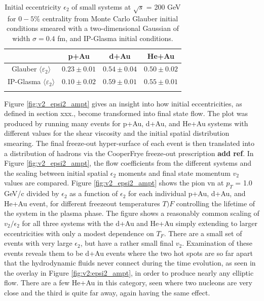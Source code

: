 \begin{table}[h!]
\begin{center}
\caption{Initial eccentricity $\epsilon_2$ of small systems at $\sqrt{s}$ = 200 GeV for $0-5\%$ centrality from Monte Carlo Glauber initial conditions smeared with a two-dimensional Gaussian of width $\sigma=0.4$ fm, and IP-Glasma initial conditions.}
\begin{tabular}{c c c c}
\label{table_geometry_glasma}
 & p+Au & d+Au & He+Au \\ \hline
 Glauber $\langle \varepsilon_2 \rangle$ & $0.23\pm 0.01$ & $0.54\pm 0.04$ & $0.50\pm 0.02$ \\
 IP-Glasma $\langle \varepsilon_2 \rangle$ & $0.10\pm 0.02$ & $0.59\pm 0.01$ & $0.55\pm 0.01$ \\
\label{tbl:eccentricities}
\end{tabular}
\end{center}
\end{table}

Figure \ref{fig:v2_epsi2_ampt} gives an insight into how initial eccentricities, as defined in section xxx., become transformed into final state flow.
The plot was produced by running many events for p+Au,
d+Au, and He+Au systems with different values for the shear
viscosity and the initial spatial distribution smearing.
The final freeze-out hyper-surface of each event is then
translated into a distribution of hadrons via the CooperFrye
freeze-out prescription \textbf{add ref}. In Figure \ref{fig:v2_epsi2_ampt},
the flow coefficients from the different systems and
the scaling between initial spatial $\epsilon_2$ moments and final
state momentum $v_2$ values are compared.
 Figure \ref{fig:v2_epsi2_ampt} shows the pion vn at
$p_T$ = 1.0 GeV/c divided by $\epsilon_2$ as a function of $\epsilon_2$ for each
individual p+Au, d+Au, and He+Au event, for different
freezeout temperatures $T)F$ controlling the lifetime of the
system in the plasma phase. The figure
shows a reasonably common scaling of $v_2/\epsilon_2$ for all three
systems with the d+Au and He+Au simply extending
to larger eccentricities with only a modest dependence
on $T_F$. There are a small set of events with very large
$\epsilon_2$, but have a rather small final $v_2$. Examination of these
events reveals them to be d+Au events where the two
hot spots are so far apart that the hydrodynamic fluids
never connect during the time evolution, as seen in the overlay in Figure \ref{fig:v2:epsi2_ampt}, in order to produce
nearly any elliptic flow. There are a few He+Au in
this category, seen where two nucleons are very close and the
third is quite far away, again having the same effect.

